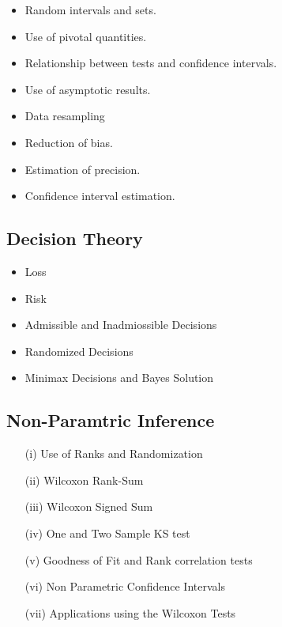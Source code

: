 \begin{itemize}
\item	Random intervals and sets. 
\item	Use of pivotal quantities. 
\item	Relationship between tests and confidence intervals. 
\item	Use of asymptotic results.
\item	Data resampling
\item	Reduction of bias. 
\item	Estimation of precision. 
\item	Confidence interval estimation.
\end{itemize}

\subsection*{Decision Theory}

\begin{itemize}
\item	Loss
\item	Risk
\item	Admissible and Inadmiossible Decisions
\item	Randomized Decisions
\item	Minimax Decisions and Bayes Solution
\end{itemize}
\subsection*{Non-Paramtric Inference}

\begin{itemize}
\item[(i)] Use of Ranks and Randomization
\item[(ii)] Wilcoxon Rank-Sum
\item[(iii)] Wilcoxon Signed Sum
\item[(iv)] One and Two Sample KS test
\item[(v)] Goodness of Fit and Rank correlation tests
\item[(vi)] Non Parametric Confidence Intervals
\item[(vii)] Applications using the Wilcoxon Tests
\end{itemize}
